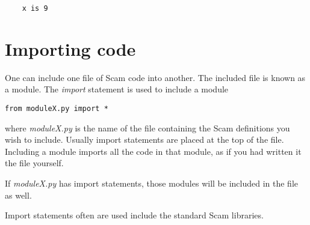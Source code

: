 \begin{verbatim}
    x is 9
\end{verbatim}

\section{Importing code}

One can include one file of Scam code into another.
The included file is known as a module. The {\it import}
statement is used to include a module

\begin{verbatim}
from moduleX.py import *
\end{verbatim}

where {\it moduleX.py} is the name of the file containing the Scam definitions
you wish to include.
Usually import statements are placed at the top of the file.
Including a module imports all the code
in that module, as if you had written it 
the file yourself.

If {\it moduleX.py} has import statements, those modules will be
included in the file as well.

Import statements often are used include the standard Scam libraries.
